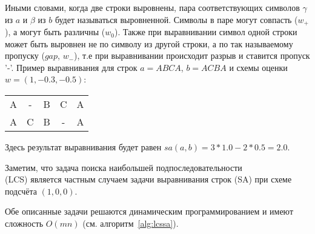 Иными словами, когда две строки выровнены, пара соответствующих символов $\gamma$ из $a$ и $\beta$  из $b$ будет называться выровненной.
Символы в паре могут совпасть ($w_{+}$), а могут быть различны ($w_{0}$).
Также при выравнивании символ одной строки может  быть выровнен не по символу из другой строки, а по так называемому пропуску ($gap$, $w_{-}$), т.е при выравнивании происходит разрыв и ставится пропуск '-'.
Пример выравнивания для строк $a=ABCA$, $b=ACBA$ и схемы оценки $w = (1, -0.3, -0.5)$:
\begin{center}
    \begin{tabular}{ccccc}
    A & - & B &  C  &  A \\
    A & C & B &  - &  A
    \end{tabular}
\end{center}
Здесь результат выравнивания будет равен $sa(a,b) = 3*1.0-2*0.5 = 2.0$.

Заметим, что задача поиска наибольшей подпоследовательности \\(LCS) является частным случаем задачи выравнивания строк (SA) при схеме подсчёта $(1,0,0)$.

Обе описанные задачи решаются динамическим программированием
и имеют сложность $O(mn)$ (см. алгоритм~\ref{alg:lcssa}).


